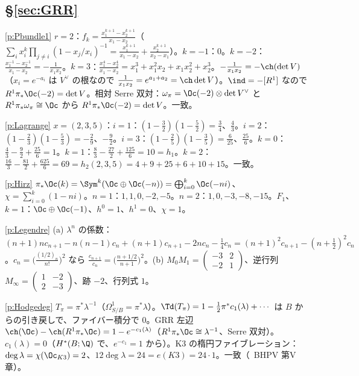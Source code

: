\subsection*{\S\ref{sec:GRR}}
\begin{sol}{\ref{p:Pbundle1}}
$r=2$：$f_k=\frac{x_1^{k+1}-x_2^{k+1}}{x_1-x_2}$（$\sum_ix_i^k\prod_{j\neq i}(1-x_j/x_i)^{-1}=\frac{x_1^{k+1}}{x_1-x_2}+\frac{x_2^{k+1}}{x_2-x_1}$）。$k=-1$：$0$。$k=-2$：$\frac{x_1^{-1}-x_2^{-1}}{x_1-x_2}=-\frac1{x_1x_2}$。$k=3$：$\frac{x_1^4-x_2^4}{x_1-x_2}=x_1^3+x_1^2x_2+x_1x_2^2+x_2^3$。$-\frac1{x_1x_2}=-\ch(\det V)$（$x_i=e^{-a_i}$ は $V^\vee$ の根なので $\frac1{x_1x_2}=e^{a_1+a_2}=\ch\det V$）。$\ind=-[R^1]$ なので $R^1\pi_*\Oc(-2)=\det V$。相対 Serre 双対：$\omega_\pi=\Oc(-2)\otimes\det V^\vee$ と $R^1\pi_*\omega_\pi\cong\Oc$ から $R^1\pi_*\Oc(-2)=\det V$。一致。
\end{sol}
\begin{sol}{\ref{p:Lagrange}}
$x=(2,3,5)$：$i=1$：$(1-\frac32)(1-\frac52)=\frac34$、$\frac43$。$i=2$：$(1-\frac23)(1-\frac53)=-\frac29$、$-\frac92$。$i=3$：$(1-\frac25)(1-\frac35)=\frac6{25}$、$\frac{25}6$。$k=0$：$\frac43-\frac92+\frac{25}6=1$。$k=1$：$\frac83-\frac{27}2+\frac{125}6=10=h_1$。$k=2$：$\frac{16}3-\frac{81}2+\frac{625}6=69=h_2(2,3,5)=4+9+25+6+10+15$。一致。
\end{sol}
\begin{sol}{\ref{p:Hirz}}
$\pi_*\Oc(k)=\Sym^k(\Oc\oplus\Oc(-n))=\bigoplus_{i=0}^k\Oc(-ni)$、$\chi=\sum_{i=0}^k(1-ni)$。$n=1$：$1,1,0,-2,-5$。$n=2$：$1,0,-3,-8,-15$。$F_1$、$k=1$：$\Oc\oplus\Oc(-1)$、$h^0=1$、$h^1=0$、$\chi=1$。
\end{sol}
\begin{sol}{\ref{p:Legendre}}
(a) $\lambda^n$ の係数：$(n+1)nc_{n+1}-n(n-1)c_n+(n+1)c_{n+1}-2nc_n-\frac14c_n=(n+1)^2c_{n+1}-(n+\frac12)^2c_n$。$c_n=\bigl(\frac{(1/2)_n}{n!}\bigr)^2$ なら $\frac{c_{n+1}}{c_n}=\bigl(\frac{n+1/2}{n+1}\bigr)^2$。(b) $M_0M_1=\begin{pmatrix}-3&2\\-2&1\end{pmatrix}$、逆行列 $M_\infty=\begin{pmatrix}1&-2\\2&-3\end{pmatrix}$、跡 $-2$、行列式 $1$。
\end{sol}
\begin{sol}{\ref{p:Hodgedeg}}
$T_\pi=\pi^*\lambda^{-1}$（$\Omega^1_{S/B}=\pi^*\lambda$）。$\Td(T_\pi)=1-\frac12\pi^*c_1(\lambda)+\cdots$ は $B$ からの引き戻しで、ファイバー積分で $0$。GRR 左辺 $\ch(\Oc)-\ch(R^1\pi_*\Oc)=1-e^{-c_1(\lambda)}$（$R^1\pi_*\Oc\cong\lambda^{-1}$、Serre 双対）。$c_1(\lambda)=0$（$H^*(B;\Q)$ で、$e^{-c_1}=1$ から）。K3 の楕円ファイブレーション：$\deg\lambda=\chi(\Oc_{K3})=2$、$12\deg\lambda=24=e(K3)=24\cdot1$。一致（\tC\ BHPV 第V章）。
\end{sol}
